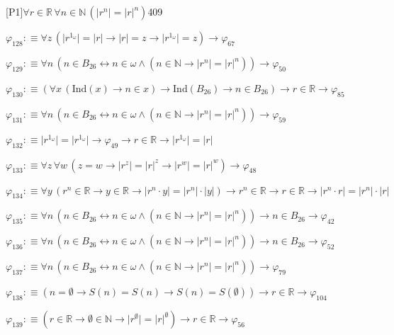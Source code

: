 \begin{fullproof}{[P1]}{$\forall r \in \mathbb{R}\,\forall n \in \mathbb{N}\,(\lvert {{r}^{n}} \rvert = {{\lvert r \rvert}^{n}})$}{409}
\begin{abbrevlist}
\item $\varphi_{128} :\equiv \forall z\,(\lvert {{r}^{1_{\omega}}} \rvert = \lvert r \rvert \to \lvert r \rvert = z \to \lvert {{r}^{1_{\omega}}} \rvert = z) \to \varphi_{67}$
\item $\varphi_{129} :\equiv \forall n\,(n \in B_{26} \leftrightarrow n \in \omega \land (n \in \mathbb{N} \to \lvert {{r}^{n}} \rvert = {{\lvert r \rvert}^{n}})) \to \varphi_{50}$
\item $\varphi_{130} :\equiv (\forall x\,(\mathrm{Ind}(x) \to n \in x) \to \mathrm{Ind}(B_{26}) \to n \in B_{26}) \to r \in \mathbb{R} \to \varphi_{85}$
\item $\varphi_{131} :\equiv \forall n\,(n \in B_{26} \leftrightarrow n \in \omega \land (n \in \mathbb{N} \to \lvert {{r}^{n}} \rvert = {{\lvert r \rvert}^{n}})) \to \varphi_{59}$
\item $\varphi_{132} :\equiv \lvert {{r}^{1_{\omega}}} \rvert = \lvert {{r}^{1_{\omega}}} \rvert \to \varphi_{49} \to r \in \mathbb{R} \to \lvert {{r}^{1_{\omega}}} \rvert = \lvert r \rvert$
\item $\varphi_{133} :\equiv \forall z\,\forall w\,(z = w \to \lvert {{r}^{z}} \rvert = {{\lvert r \rvert}^{z}} \to \lvert {{r}^{w}} \rvert = {{\lvert r \rvert}^{w}}) \to \varphi_{48}$
\item $\varphi_{134} :\equiv \forall y\,({{r}^{n}} \in \mathbb{R} \to y \in \mathbb{R} \to \lvert {{r}^{n}} \cdot y \rvert = \lvert {{r}^{n}} \rvert \cdot \lvert y \rvert) \to {{r}^{n}} \in \mathbb{R} \to r \in \mathbb{R} \to \lvert {{r}^{n}} \cdot r \rvert = \lvert {{r}^{n}} \rvert \cdot \lvert r \rvert$
\item $\varphi_{135} :\equiv \forall n\,(n \in B_{26} \leftrightarrow n \in \omega \land (n \in \mathbb{N} \to \lvert {{r}^{n}} \rvert = {{\lvert r \rvert}^{n}})) \to n \in B_{26} \to \varphi_{42}$
\item $\varphi_{136} :\equiv \forall n\,(n \in B_{26} \leftrightarrow n \in \omega \land (n \in \mathbb{N} \to \lvert {{r}^{n}} \rvert = {{\lvert r \rvert}^{n}})) \to n \in B_{26} \to \varphi_{52}$
\item $\varphi_{137} :\equiv \forall n\,(n \in B_{26} \leftrightarrow n \in \omega \land (n \in \mathbb{N} \to \lvert {{r}^{n}} \rvert = {{\lvert r \rvert}^{n}})) \to \varphi_{79}$
\item $\varphi_{138} :\equiv (n = \emptyset \to S(n) = S(n) \to S(n) = S(\emptyset)) \to r \in \mathbb{R} \to \varphi_{104}$
\item $\varphi_{139} :\equiv (r \in \mathbb{R} \to \emptyset \in \mathbb{N} \to \lvert {{r}^{\emptyset}} \rvert = {{\lvert r \rvert}^{\emptyset}}) \to r \in \mathbb{R} \to \varphi_{56}$

\end{abbrevlist}
\end{fullproof}

